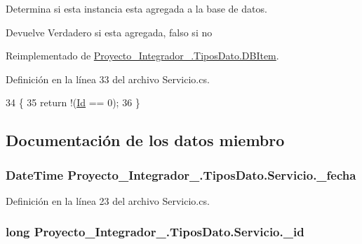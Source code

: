 Determina si esta instancia esta agregada a la base de datos. 

\begin{DoxyReturn}{Devuelve}
Verdadero si esta agregada, falso si no
\end{DoxyReturn}


Reimplementado de \hyperlink{class_proyecto___integrador__3_1_1_tipos_dato_1_1_d_b_item_ab88d7eef0fa58d7d5fdf40039867dd6e}{Proyecto\-\_\-\-Integrador\-\_.\-Tipos\-Dato.\-D\-B\-Item}.



Definición en la línea 33 del archivo Servicio.\-cs.


\begin{DoxyCode}
34         \{
35             \textcolor{keywordflow}{return} !(\hyperlink{class_proyecto___integrador__3_1_1_tipos_dato_1_1_servicio_a81c451c62cc6b77b6f80614df5ffb80d}{Id} == 0);
36         \}
\end{DoxyCode}


\subsection{Documentación de los datos miembro}
\hypertarget{class_proyecto___integrador__3_1_1_tipos_dato_1_1_servicio_af33dd41383dbfde1410187bcb1951b95}{
\subsubsection[{\-\_\-fecha}]{\setlength{\rightskip}{0pt plus 5cm}Date\-Time Proyecto\-\_\-\-Integrador\-\_.\-Tipos\-Dato.\-Servicio.\-\_\-fecha\hspace{0.3cm}{\ttfamily [private]}}}\label{class_proyecto___integrador__3_1_1_tipos_dato_1_1_servicio_af33dd41383dbfde1410187bcb1951b95}


Definición en la línea 23 del archivo Servicio.\-cs.

\hypertarget{class_proyecto___integrador__3_1_1_tipos_dato_1_1_servicio_a127ad69f3c770d82a248b73276e41388}{
\subsubsection[{\-\_\-id}]{\setlength{\rightskip}{0pt plus 5cm}long Proyecto\-\_\-\-Integrador\-\_.\-Tipos\-Dato.\-Servicio.\-\_\-id\hspace{0.3cm}{\ttfamily [private]}}}\label{class_proyecto___integrador__3_1_1_tipos_dato_1_1_servicio_a127ad69f3c770d82a248b73276e41388}


